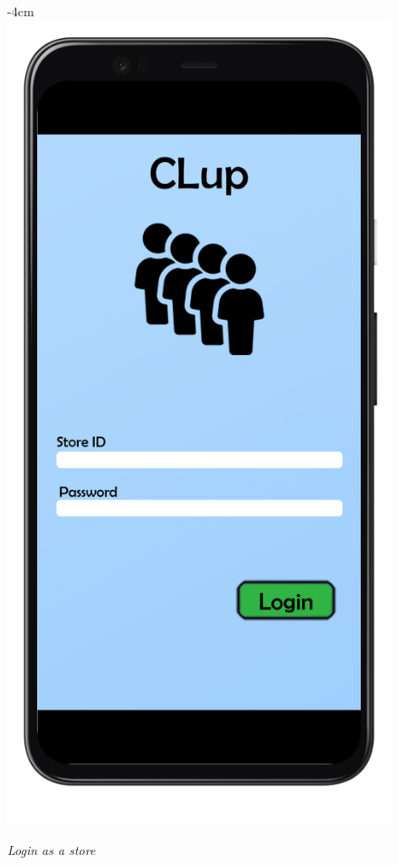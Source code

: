 \documentclass{article}
\begin{document}
		\begin{figure}[H]
			\begin{adjustwidth} {-4cm}{}
				\centering
				\includegraphics[scale=0.45]{../Mockups/LoginStore.png}\\
			\end{adjustwidth}
			\caption{\emph{Login as a store}}
		\end{figure}
		
\end{document}
